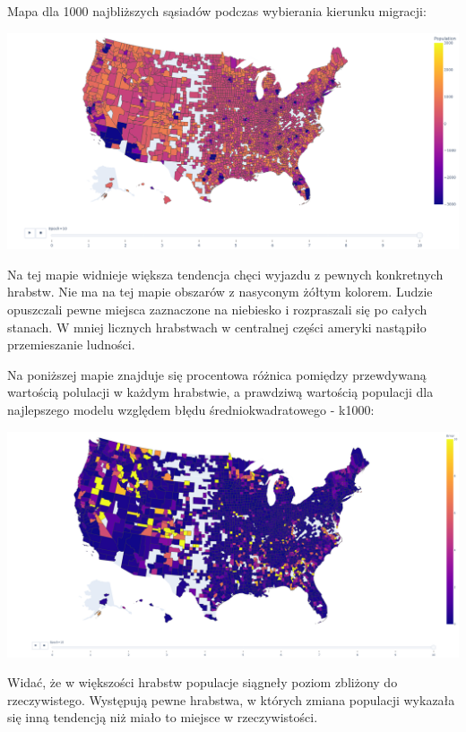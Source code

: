 \documentclass[a4paper,12pt]{article}
\begin{document}
Mapa dla 1000 najbliższych sąsiadów podczas wybierania kierunku migracji:
\begin{center}
    \includegraphics*[width=15cm]{./pictures/population_k1000.png}
\end{center}
Na tej mapie widnieje większa tendencja chęci wyjazdu z pewnych konkretnych hrabstw. Nie ma na tej mapie obszarów z nasyconym żółtym kolorem. Ludzie opuszczali pewne miejsca zaznaczone na niebiesko i rozpraszali się po całych stanach. W mniej licznych hrabstwach w centralnej części ameryki nastąpiło przemieszanie ludności.

Na poniższej mapie znajduje się procentowa różnica pomiędzy przewdywaną wartością polulacji w każdym hrabstwie, a prawdziwą wartością populacji dla najlepszego modelu względem błędu średniokwadratowego - k1000:
\begin{center}
    \includegraphics*[width=15cm]{./pictures/error_k1000.png}
\end{center}
Widać, że w większości hrabstw populacje siągneły poziom zbliżony do rzeczywistego. Występują pewne hrabstwa, w których zmiana populacji wykazała się inną tendencją niż miało to miejsce w rzeczywistości. 
\end{document}
